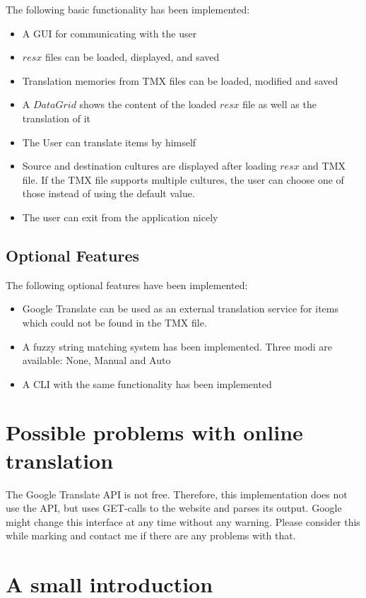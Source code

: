 \documentclass[a4paper, 12pt]{scrartcl} %
\begin{document}
The following basic functionality has been implemented:
\begin{itemize}
  \item A GUI for communicating with the user
  \item $resx$ files can be loaded, displayed, and saved
  \item Translation memories from TMX files can be loaded, modified and saved
  \item A $DataGrid$ shows the content of the loaded $resx$ file as well as the
    translation of it
  \item The User can translate items by himself
  \item Source and destination cultures are displayed after loading $resx$ and
    TMX file. If the TMX file supports multiple cultures, the user can choose
    one of those instead of using the default value.
  \item The user can exit from the application nicely
\end{itemize}

\subsection{Optional Features}

The following optional features have been implemented:
\begin{itemize}
  \item Google Translate can be used as an external translation service for
    items which could not be found in the TMX file.
  \item A fuzzy string matching system has been implemented. Three modi are
    available: None, Manual and Auto
  \item A CLI with the same functionality has been implemented
\end{itemize}

\section{Possible problems with online translation}

The Google Translate API is not free. Therefore, this implementation does not use the API, but uses GET-calls to the website and parses its output. Google might change this interface at any time without any warning. Please consider this while marking and contact me if there are any problems with that.

\section{A small introduction}
\end{document}
